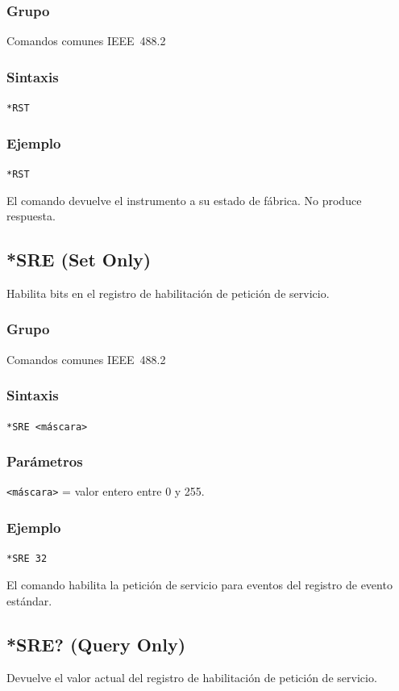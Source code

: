\subsubsection*{Grupo}
Comandos comunes IEEE~488.2

\subsubsection*{Sintaxis}
\texttt{*RST}

\subsubsection*{Ejemplo}
\texttt{*RST}

El comando devuelve el instrumento a su estado de fábrica. No produce respuesta.

\subsection*{*SRE (Set Only)}

Habilita bits en el registro de habilitación de petición de servicio.

\subsubsection*{Grupo}
Comandos comunes IEEE~488.2

\subsubsection*{Sintaxis}
\texttt{*SRE <máscara>}

\subsubsection*{Parámetros}
\texttt{<máscara>} = valor entero entre 0 y 255.

\subsubsection*{Ejemplo}
\texttt{*SRE 32}

El comando habilita la petición de servicio para eventos del registro de evento estándar.

\subsection*{*SRE? (Query Only)}

Devuelve el valor actual del registro de habilitación de petición de
servicio.

